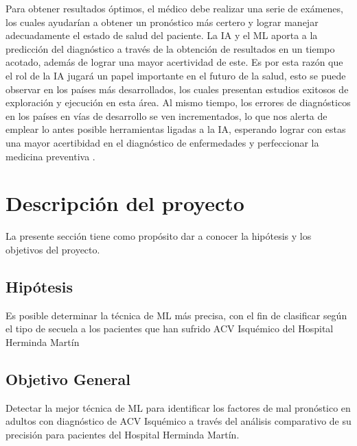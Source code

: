 \par Para obtener resultados óptimos, el médico debe realizar una serie de exámenes,  los cuales  ayudarían a obtener  un pronóstico más  certero y  lograr manejar  adecuadamente el estado de salud del paciente. La IA y el ML  aporta a la predicción del diagnóstico a través  de la obtención de resultados en un tiempo acotado,  además de lograr una mayor acertividad de este.  Es por esta razón que el rol de la IA jugará un papel importante  en el  futuro de la salud,  esto se puede observar  en los países más desarrollados, los cuales  presentan estudios exitosos   de  exploración y ejecución en  esta área. Al mismo tiempo, los errores de diagnósticos en los países en vías de desarrollo se ven incrementados, lo que nos alerta de emplear  lo antes posible  herramientas ligadas a la IA, esperando lograr  con estas  una mayor  acertibidad  en el diagnóstico de enfermedades y  perfeccionar la medicina preventiva \cite{Curioso2020}.


\doublespacing
\section{Descripción del proyecto}
La presente sección tiene como propósito dar a conocer la hipótesis y los objetivos del proyecto.\\

\doublespacing
\subsection{Hipótesis}
Es posible determinar la técnica de ML más precisa, con el fin de clasificar según el tipo de secuela a los pacientes que han sufrido ACV Isquémico del Hospital Herminda Martín\\

\doublespacing
\subsection{Objetivo General}
Detectar la mejor técnica de ML para identificar los factores de mal pronóstico en adultos con diagnóstico de ACV Isquémico a través del análisis comparativo de su precisión para pacientes del Hospital Herminda Martín.\\

\doublespacing
